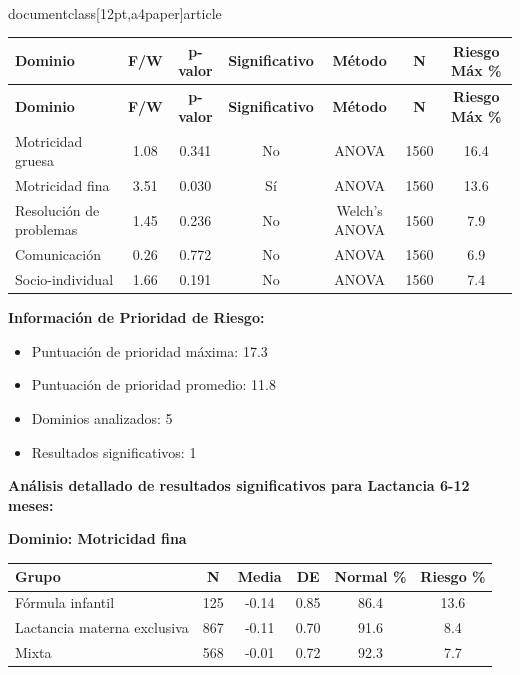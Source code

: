 \\documentclass[12pt,a4paper]{article}
\begin{document}
\begin{longtable}{|l|c|c|c|c|c|c|}
\hline
\textbf{Dominio} & \textbf{F/W} & \textbf{p-valor} & \textbf{Significativo} & \textbf{Método} & \textbf{N} & \textbf{Riesgo Máx \%} \\
\hline
\endfirsthead

\hline
\textbf{Dominio} & \textbf{F/W} & \textbf{p-valor} & \textbf{Significativo} & \textbf{Método} & \textbf{N} & \textbf{Riesgo Máx \%} \\
\hline
\endhead

\hline
\endfoot

\hline
\endlastfoot

Motricidad gruesa & 1.08 & 0.341 & No & ANOVA & 1560 & 16.4 \\
Motricidad fina & 3.51 & 0.030 & Sí & ANOVA & 1560 & 13.6 \\
Resolución de problemas & 1.45 & 0.236 & No & Welch's ANOVA & 1560 & 7.9 \\
Comunicación & 0.26 & 0.772 & No & ANOVA & 1560 & 6.9 \\
Socio-individual & 1.66 & 0.191 & No & ANOVA & 1560 & 7.4 \\

\end{longtable}


\textbf{Información de Prioridad de Riesgo:}
\begin{itemize}
\item Puntuación de prioridad máxima: 17.3
\item Puntuación de prioridad promedio: 11.8
\item Dominios analizados: 5
\item Resultados significativos: 1
\end{itemize}


\textbf{Análisis detallado de resultados significativos para Lactancia 6-12 meses:}


\textbf{Dominio: Motricidad fina}


\begin{center}
\begin{tabular}{|l|c|c|c|c|c|}
\hline
\textbf{Grupo} & \textbf{N} & \textbf{Media} & \textbf{DE} & \textbf{Normal \%} & \textbf{Riesgo \%} \\
\hline
Fórmula infantil & 125 & -0.14 & 0.85 & 86.4 & 13.6 \\
Lactancia materna exclusiva & 867 & -0.11 & 0.70 & 91.6 & 8.4 \\
Mixta & 568 & -0.01 & 0.72 & 92.3 & 7.7 \\

\hline
\end{tabular}
\end{center}
\end{document}
